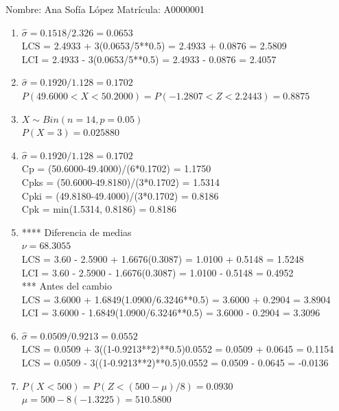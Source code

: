 \documentclass[8pt]{report}
\begin{document}
Nombre: \underline{\hspace*{.2in}}
Ana Sofía López
\underline{\hspace*{.2in}} \quad Matr\'icula:\underline{\hspace*{.2in}}
A0000001
\underline{\hspace*{.2in}} \\

\begin{enumerate}
\item $\hat\sigma = 0.1518/2.326 = 0.0653$\\
LCS = 2.4933 + 3(0.0653/5**0.5) = 2.4933 + 0.0876 = 2.5809\\
LCI = 2.4933 - 3(0.0653/5**0.5) = 2.4933 - 0.0876 = 2.4057
\item $\hat\sigma = 0.1920/1.128 = 0.1702$\\
$P(49.6000 < X < 50.2000) = P(-1.2807 < Z < 2.2443) = 0.8875$\\
\item $X \sim Bin(n=14, p=0.05)$\\
$P(X = 3) = 0.025880$
\item $\hat\sigma = 0.1920/1.128 = 0.1702$\\
Cp = (50.6000-49.4000)/(6*0.1702) = 1.1750\\
Cpks = (50.6000-49.8180)/(3*0.1702) = 1.5314\\
Cpki = (49.8180-49.4000)/(3*0.1702) = 0.8186\\
Cpk = min(1.5314, 0.8186) = 0.8186
\item **** Diferencia de medias\\
$\nu = 68.3055$\\
LCS = 3.60 - 2.5900 + 1.6676(0.3087) = 1.0100 + 0.5148 = 1.5248\\
LCI = 3.60 - 2.5900 - 1.6676(0.3087) = 1.0100 - 0.5148 = 0.4952\\
*** Antes del cambio\\
LCS = 3.6000 + 1.6849(1.0900/6.3246**0.5) = 3.6000 + 0.2904 = 3.8904\\
LCI = 3.6000 - 1.6849(1.0900/6.3246**0.5) = 3.6000 - 0.2904 = 3.3096\\
\item $\hat\sigma = 0.0509/0.9213 = 0.0552$\\
LCS = 0.0509 + 3((1-0.9213**2)**0.5)0.0552 = 0.0509 + 0.0645 = 0.1154\\
LCS = 0.0509 - 3((1-0.9213**2)**0.5)0.0552 = 0.0509 - 0.0645 = -0.0136
\item $P(X < 500) = P(Z < (500-\mu)/8) = 0.0930$\\
$\mu = 500 - 8(-1.3225) = 510.5800$\\
\end{enumerate}
\end{document}
